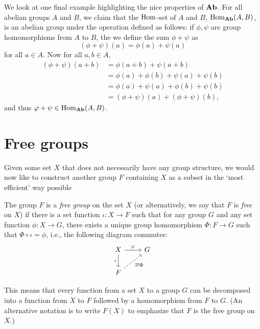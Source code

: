 We look at one final example highlighting the nice properties of \(\mathbf{Ab}\). For
all abelian groups \(A\) and \(B\), we claim that the \(\operatorname{Hom}\)-set of \(A\) and
\(B\), \(\operatorname{Hom}_{\mathbf{Ab}}(A, B)\), is an abelian group under the operation defined as
follows: if \(\phi, \psi\) are group homomorphisms from \(A\) to \(B\), the we
define the sum \(\phi + \psi\) as
\[
    (\phi + \psi)(a) = \phi(a) + \psi(a)
\]
for all \(a \in A\). Now for all \(a, b \in A\),
\begin{align*}
    (\phi + \psi)(a + b) &= \phi(a + b) + \psi(a + b)\\
    &= \phi(a) + \phi(b) + \psi(a) + \psi(b)\\
    &= \phi(a) + \psi(a) + \phi(b) + \psi(b)\\
    &= (\phi + \psi)(a) + (\phi + \psi)(b),
\end{align*}
and thus \(\varphi + \psi \in \operatorname{Hom}_{\mathbf{Ab}}(A, B)\).

\section{Free groups}
\label{sec:free-groups}

Given some set \(X\) that does not necessarily have any group structure, we
would now like to construct another group \(F\) containing \(X\) as a subset in
the `most efficient' way possible

\begin{definition}
    \label{def:free-group}
    The group \(F\) is a \emph{free group} on the set \(X\) (or alternatively,
    we say that \(F\) is \emph{free} on \(X\)) if there is a set function
    \(\iota: X \to F\) such that for any group \(G\) and any set function
    \(\phi: X \to G\), there exists a unique group homomorphism \(\Phi: F \to
    G\) such that \(\Phi \circ \iota = \phi\), i.e., the following diagram
    commutes:
    \[
        \begin{tikzcd}
            X \arrow[d, "\iota"'] \arrow[r, "\phi"] & G \\
            F \arrow[ru, "\exists!\Phi"', dashed]        &  
        \end{tikzcd}
    \]
\end{definition}

This means that every function from a set \(X\) to a group \(G\) can be
decomposed into a function from \(X\) to \(F\) followed by a homomorphism from
\(F\) to \(G\). (An alternative notation is to write \(F(X)\) to emphasize that
\(F\) is the free group on \(X\).)

